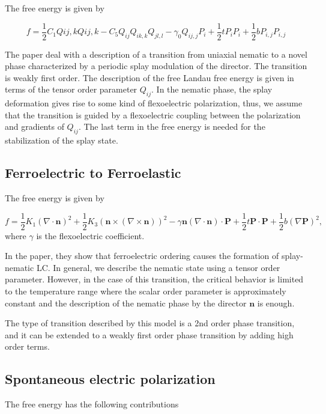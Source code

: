 \documentclass{article}
\begin{document}
The free energy is given by 

\begin{equation}
    f = \frac{1}{2}C_{1} Q{ij,k}Q{ij,k}-C_5 Q_{ij}Q_{ik,k}Q_{jl,l}-\gamma_0 Q_{ij,j}P_i + \frac{1}{2}t P_{i}P_{i} + \frac{1}{2}bP_{i,j}P_{i,j}
    \end{equation}

The paper deal with a description of a transition from uniaxial nematic to a novel phase characterized by a periodic splay modulation of the director. The transition is weakly first order. The description of the free Landau free energy is given in terms of the tensor order parameter $Q_{ij}$.
In the nematic phase, the splay deformation gives rise to some kind of flexoelectric polarization, thus, we assume that the transition is guided by a flexoelectric coupling between the polarization and gradients of $Q_{ij}$.
The last term in the free energy is needed for the stabilization of the splay state.


\subsection{Ferroelectric to Ferroelastic\cite{sebastian2020ferroelectric}}
The free energy is given by

\begin{equation}
    f = \frac{1}{2}K_{1}(\nabla\cdot \mathbf{n})^2 +\frac{1}{2}K_3(\mathbf{n}\times(\nabla\times\mathbf{n}))^2 - \gamma \mathbf{n}(\nabla\cdot\mathbf{n})\cdot\mathbf{P}+\frac{1}{2}t\mathbf{P}\cdot\mathbf{P}+\frac{1}{2}b(\nabla\mathbf{P})^2,
\end{equation}
where $\gamma$ is the flexoelectric coefficient.

In the paper, they show that ferroelectric ordering causes the formation of splay-nematic LC. In general, we describe the nematic state using a tensor order parameter. However, in the case of this transition, the critical behavior is limited to the temperature range where the scalar order parameter is approximately constant and the description of the nematic phase by the director $\mathbf{n}$ is enough.

The type of transition described by this model is a 2nd order phase transition, and it can be extended to a weakly first order phase transition by adding high order terms.


\subsection{Spontaneous electric polarization\cite{yang2022spontaneous}}
The free energy has the following contributions
\end{document}

